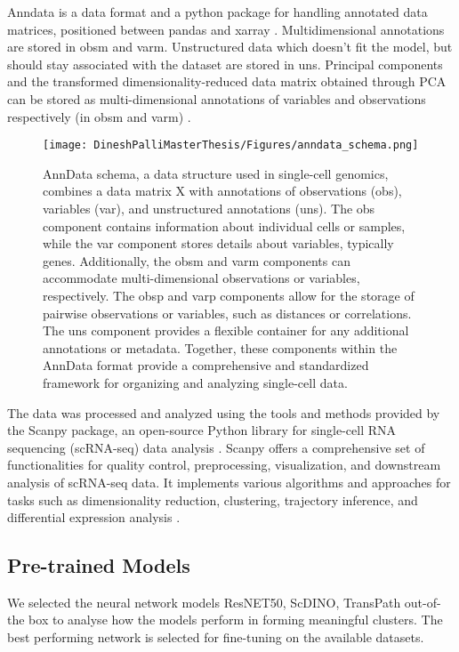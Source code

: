 \documentclass[12pt,a4paper]{article}
\begin{document}
Anndata is a data format and a python package for handling annotated data matrices, positioned between pandas and xarray \cite{virshup_rybakov_theis_angerer_wolf_2021}. Multidimensional annotations are stored in obsm and varm. Unstructured data which doesn’t fit the model, but should stay associated with the dataset are stored in uns. Principal components and the transformed dimensionality-reduced data matrix obtained through PCA can be stored as multi-dimensional annotations of variables and observations respectively (in obsm and varm) \cite{virshup_rybakov_theis_angerer_wolf_2021}.

\begin{figure}
  \centering
  \texttt{[image: DineshPalliMasterThesis/Figures/anndata\_schema.png]}
  \caption{AnnData schema, a data structure used in single-cell genomics, combines a data matrix X with annotations of observations (obs), variables (var), and unstructured annotations (uns). The obs component contains information about individual cells or samples, while the var component stores details about variables, typically genes. Additionally, the obsm and varm components can accommodate multi-dimensional observations or variables, respectively. The obsp and varp components allow for the storage of pairwise observations or variables, such as distances or correlations. The uns component provides a flexible container for any additional annotations or metadata. Together, these components within the AnnData format provide a comprehensive and standardized framework for organizing and analyzing single-cell data.}
  \label{adata}
\end{figure}

The data was processed and analyzed using the tools and methods provided by the Scanpy package, an open-source Python library for single-cell RNA sequencing (scRNA-seq) data analysis \cite{wolf_angerer_theis_2018}. Scanpy offers a comprehensive set of functionalities for quality control, preprocessing, visualization, and downstream analysis of scRNA-seq data. It implements various algorithms and approaches for tasks such as dimensionality reduction, clustering, trajectory inference, and differential expression analysis \cite{wolf_angerer_theis_2018}.

\subsection{Pre-trained Models}
We selected the neural network models ResNET50, ScDINO, TransPath out-of-the box to analyse how the models perform in forming meaningful clusters. The best performing network is selected for fine-tuning on the available datasets.
\end{document}
